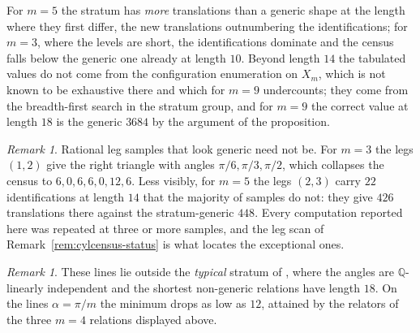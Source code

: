 \documentclass[11pt]{article}
\theoremstyle{definition}
\theoremstyle{remark}
\newtheorem{remark}[theorem]{Remark}
\newcommand{\Q}{\mathbb{Q}}
\begin{document}
For $m=5$ the stratum has \emph{more} translations than a generic shape at
the length where they first differ, the new translations outnumbering the
identifications; for $m=3$, where the levels are short, the identifications
dominate and the census falls below the generic one already at length $10$.
Beyond length $14$ the tabulated values do not come from the configuration
enumeration on $X_m$, which is not known to be exhaustive there and which for
$m=9$ undercounts; they come from the breadth-first search in the stratum group,
and for $m=9$ the correct value at length $18$ is the generic $3684$ by the
argument of the proposition.

\begin{remark}\label{rem:samples}
Rational leg samples that look generic need not be. For $m=3$ the legs $(1,2)$
give the right triangle with angles $\pi/6,\pi/3,\pi/2$, which collapses the
census to $6,0,6,6,0,12,6$. Less visibly, for $m=5$ the legs $(2,3)$ carry $22$
identifications at length $14$ that the majority of samples do not: they give
$426$ translations there against the stratum-generic $448$. Every computation
reported here was repeated at three or more samples, and the leg scan of
Remark~\ref{rem:cylcensus-status} is what locates the exceptional ones.
\end{remark}

\begin{remark}
These lines lie outside the \emph{typical} stratum of \cite{IP}, where the
angles are $\Q$-linearly independent and the shortest non-generic relations have
length $18$. On the lines $\alpha=\pi/m$ the minimum drops as low as $12$,
attained by the relators of the three $m=4$ relations displayed above.
\end{remark}
\end{document}
